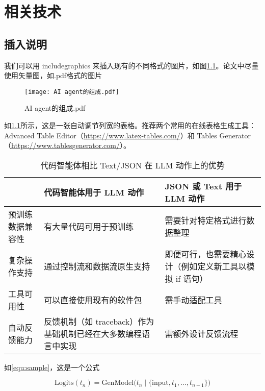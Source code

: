 \cleardoublepage{}

\chapter{相关技术}



\section{插入说明}

我们可以用 includegraphics 来插入现有的不同格式的图片，如图\ref{fig:ai-agent}。论文中尽量使用矢量图，如.pdf格式的图片

\begin{figure}[ht]
    \centering
    \texttt{[image: AI agent的组成.pdf]}
    \caption{\label{fig:ai-agent}AI agent的组成.pdf}
\end{figure}

\par 如\ref{tab:compare}所示，这是一张自动调节列宽的表格。推荐两个常用的在线表格生成工具：Advanced Table Editor（\url{https://www.latex-tables.com/}）和 Tables Generator（\url{https://www.tablesgenerator.com/}）。


\begin{table}[ht]
	\footnotesize           
	\centering
	\caption{代码智能体相比 Text/JSON 在 LLM 动作上的优势}
	\label{tab:compare}
	\setlength\extrarowheight{2pt}  %
	\begin{tabularx}{\textwidth}{lXX}
		\toprule
		& \textbf{代码智能体用于 LLM 动作} & \textbf{JSON 或 Text 用于 LLM 动作} \\
		\midrule
		预训练数据兼容性 & 有大量代码可用于预训练 & 需要针对特定格式进行数据整理 \\
		复杂操作支持 & 通过控制流和数据流原生支持 & 即便可行，也需要精心设计（例如定义新工具以模拟 if 语句） \\
		工具可用性 & 可以直接使用现有的软件包 & 需手动适配工具 \\
		自动反馈能力 & 反馈机制（如 traceback）作为基础机制已经在大多数编程语言中实现 & 需额外设计反馈流程 \\
		\bottomrule
	\end{tabularx}
\end{table}

\par 如\ref{equ:sample}，这是一个公式

\begin{equation}
\label{equ:sample}
\mathrm{Logits}(t_n) = \mathrm{GenModel}\bigl(t_n \mid \{\mathrm{input}, t_1, \ldots, t_{n-1}\}\bigr)
\end{equation}

